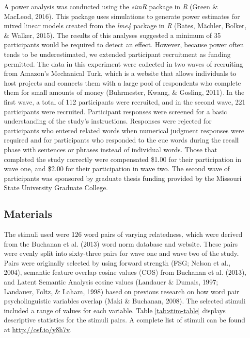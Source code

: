 \documentclass[english,,man]{apa6}
\begin{document}
A power analysis was conducted using the \emph{simR} package in \emph{R} (Green \& MacLeod, 2016). This package uses simulations to generate power estimates for mixed linear models created from the \emph{lme4} package in \emph{R} (Bates, Mächler, Bolker, \& Walker, 2015). The results of this analyses suggested a minimum of 35 participants would be required to detect an effect. However, because power often tends to be underestimated, we extended participant recruitment as funding permitted. The data in this experiment were collected in two waves of recruiting from Amazon's Mechanical Turk, which is a website that allows individuals to host projects and connects them with a large pool of respondents who complete them for small amounts of money (Buhrmester, Kwang, \& Gosling, 2011). In the first wave, a total of 112 participants were recruited, and in the second wave, 221 participants were recruited. Participant responses were screened for a basic understanding of the study's instructions. Responses were rejected for participants who entered related words when numerical judgment responses were required and for participants who responded to the cue words during the recall phase with sentences or phrases instead of individual words. Those that completed the study correctly were compensated \$1.00 for their participation in wave one, and \$2.00 for their participation in wave two. The second wave of participants was sponsored by graduate thesis funding provided by the Missouri State University Graduate College.

\hypertarget{materials}{%
\subsection{Materials}\label{materials}}

The stimuli used were 126 word pairs of varying relatedness, which were derived from the Buchanan et al. (2013) word norm database and website. These pairs were evenly split into sixty-three pairs for wave one and wave two of the study. Pairs were originally selected by using forward strength (FSG; Nelson et al., 2004), semantic feature overlap cosine values (COS) from Buchanan et al. (2013), and Latent Semantic Analysis cosine values (Landauer \& Dumais, 1997; Landauer, Foltz, \& Laham, 1998) based on previous research on how word pair psycholinguistic variables overlap (Maki \& Buchanan, 2008). The selected stimuli included a range of values for each variable. Table \ref{tab:stim-table} displays descriptive statistics for the stimuli pairs. A complete list of stimuli can be found at \url{http://osf.io/y8h7v}.
\end{document}
